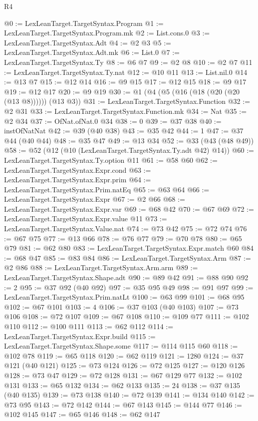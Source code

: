 \begin{lexlean}{R4}
\begin{coremodule}
@0 := LexLeanTarget.TargetSyntax.Program
@1 := LexLeanTarget.TargetSyntax.Program.mk
@2 := List.cons.{0}
@3 := LexLeanTarget.TargetSyntax.Adt
@4 := @2 @3
@5 := LexLeanTarget.TargetSyntax.Adt.mk
@6 := List.{0}
@7 := LexLeanTarget.TargetSyntax.Ty
@8 := @6 @7
@9 := @2 @8
@10 := @2 @7
@11 := LexLeanTarget.TargetSyntax.Ty.nat
@12 := @10 @11
@13 := List.nil.{0}
@14 := @13 @7
@15 := @12 @14
@16 := @9 @15
@17 := @12 @15
@18 := @9 @17
@19 := @12 @17
@20 := @9 @19
@30 := @1 (@4 (@5 (@16 (@18 (@20 (@20 (@13 @8)))))) (@13 @3))
@31 := LexLeanTarget.TargetSyntax.Function
@32 := @2 @31
@33 := LexLeanTarget.TargetSyntax.Function.mk
@34 := Nat
@35 := @2 @34
@37 := OfNat.ofNat.{0} @34
@38 := 0
@39 := @37 @38
@40 := instOfNatNat
@42 := @39 (@40 @38)
@43 := @35 @42
@44 := 1
@47 := @37 @44 (@40 @44)
@48 := @35 @47
@49 := @13 @34
@52 := @33 (@43 (@48 @49))
@58 := @52 (@12 (@10 (LexLeanTarget.TargetSyntax.Ty.adt @42) @14))
@60 := LexLeanTarget.TargetSyntax.Ty.option @11
@61 := @58 @60
@62 := LexLeanTarget.TargetSyntax.Expr.cond
@63 := LexLeanTarget.TargetSyntax.Expr.prim
@64 := LexLeanTarget.TargetSyntax.Prim.natEq
@65 := @63 @64
@66 := LexLeanTarget.TargetSyntax.Expr
@67 := @2 @66
@68 := LexLeanTarget.TargetSyntax.Expr.var
@69 := @68 @42
@70 := @67 @69
@72 := LexLeanTarget.TargetSyntax.Expr.value @11
@73 := LexLeanTarget.TargetSyntax.Value.nat
@74 := @73 @42
@75 := @72 @74
@76 := @67 @75
@77 := @13 @66
@78 := @76 @77
@79 := @70 @78
@80 := @65 @79
@81 := @62 @80
@83 := LexLeanTarget.TargetSyntax.Expr.match @60
@84 := @68 @47
@85 := @83 @84
@86 := LexLeanTarget.TargetSyntax.Arm
@87 := @2 @86
@88 := LexLeanTarget.TargetSyntax.Arm.arm
@89 := LexLeanTarget.TargetSyntax.Shape.adt
@90 := @89 @42
@91 := @88 @90
@92 := 2
@95 := @37 @92 (@40 @92)
@97 := @35 @95 @49
@98 := @91 @97
@99 := LexLeanTarget.TargetSyntax.Prim.natLt
@100 := @63 @99
@101 := @68 @95
@102 := @67 @101
@103 := 4
@106 := @37 @103 (@40 @103)
@107 := @73 @106
@108 := @72 @107
@109 := @67 @108
@110 := @109 @77
@111 := @102 @110
@112 := @100 @111
@113 := @62 @112
@114 := LexLeanTarget.TargetSyntax.Expr.build
@115 := LexLeanTarget.TargetSyntax.Shape.some
@117 := @114 @115 @60
@118 := @102 @78
@119 := @65 @118
@120 := @62 @119
@121 := 1280
@124 := @37 @121 (@40 @121)
@125 := @73 @124
@126 := @72 @125
@127 := @120 @126
@128 := @73 @47
@129 := @72 @128
@131 := @67 @129 @77
@132 := @102 @131
@133 := @65 @132
@134 := @62 @133
@135 := 24
@138 := @37 @135 (@40 @135)
@139 := @73 @138
@140 := @72 @139
@141 := @134 @140
@142 := @73 @95
@143 := @72 @142
@144 := @67 @143
@145 := @144 @77
@146 := @102 @145
@147 := @65 @146
@148 := @62 @147

\end{coremodule}
\end{lexlean}
